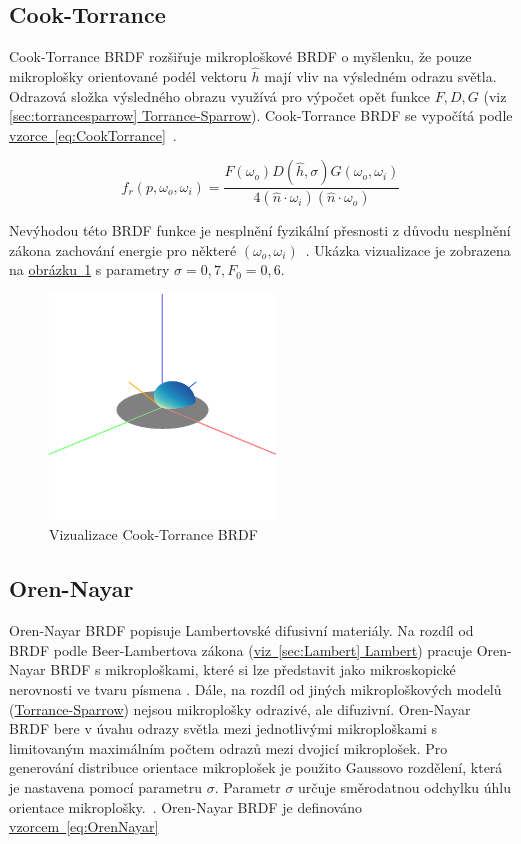 \documentclass[czech,master]{diploma}
\newcommand{\uvec}[1]{\hat{#1}}
\newcommand{\point}{p}
\newcommand{\brdf}{f_r\left(\point,\omega_{o},\omega_{i}\right)}
\newcommand{\normVec}{\uvec{n}}
\newcommand{\inVec}{\omega_{i}}
\newcommand{\outVec}{\omega_{o}}
\newcommand{\halfVec}{\uvec{h}}
\newcommand{\rough}{\sigma}
\newcommand{\Fzero}{F_0}
\begin{document}
\subsection{Cook-Torrance}
Cook-Torrance BRDF rozšiřuje mikroploškové BRDF o myšlenku, že pouze mikroplošky orientované podél vektoru \(\halfVec\) mají vliv na výsledném odrazu světla. Odrazová složka výsledného obrazu využívá pro výpočet opět funkce \(F, D, G\) (viz \hyperref[sec:torrancesparrow]{\ref{sec:torrancesparrow} Torrance-Sparrow}). Cook-Torrance BRDF se vypočítá podle \hyperref[eq:CookTorrance]{vzorce~\ref{eq:CookTorrance}}~\cite{CookTorranceBRDF}.

\begin{equation} \label{eq:CookTorrance}
  \brdf  = \frac{F(\outVec) D(\halfVec,\rough) G(\outVec,\inVec)}{4 (\normVec\cdot\inVec) (\normVec\cdot\outVec)}
\end{equation}

Nevýhodou této BRDF funkce je nesplnění fyzikální přesnosti z důvodu nesplnění zákona zachování energie pro některé \(\left(\outVec,\inVec\right)\)~\cite{BRDFOverview}. Ukázka vizualizace je zobrazena na \hyperref[fig:cookTorranceBRDFRender]{obrázku~\ref{fig:cookTorranceBRDFRender}} s parametry \(\rough=0{,}7, \Fzero = 0{,}6\).


\begin{figure}[ht]%
  \centering\includegraphics[width=6cm]{Figures/visualizations/brdfCookTorrance.png}%
  \caption{Vizualizace Cook-Torrance BRDF}%
  \label{fig:cookTorranceBRDFRender}%
\end{figure}

\subsection{Oren-Nayar}
Oren-Nayar BRDF popisuje Lambertovské difusivní materiály. Na rozdíl od BRDF podle Beer-Lambertova zákona (\hyperref[sec:Lambert]{viz~\ref{sec:Lambert} Lambert}) pracuje Oren-Nayar BRDF s mikroploškami, které si lze představit jako mikroskopické nerovnosti ve tvaru písmena . Dále, na rozdíl od jiných mikroploškových modelů (\hyperref[sec:torrancesparrow]{Torrance-Sparrow}) nejsou mikroplošky odrazivé, ale difuzivní. Oren-Nayar BRDF bere v úvahu odrazy světla mezi jednotlivými mikroploškami s limitovaným maximálním počtem odrazů mezi dvojicí mikroplošek. Pro generování distribuce orientace mikroplošek je použito Gaussovo rozdělení, která je nastavena pomocí parametru \(\rough\). Parametr \(\rough\) určuje směrodatnou odchylku úhlu orientace mikroplošky.~\cite{BRDFOverview, OrenNayar}. Oren-Nayar BRDF je definováno \hyperref[eq:OrenNayar]{vzorcem~\ref{eq:OrenNayar}}
\end{document}
